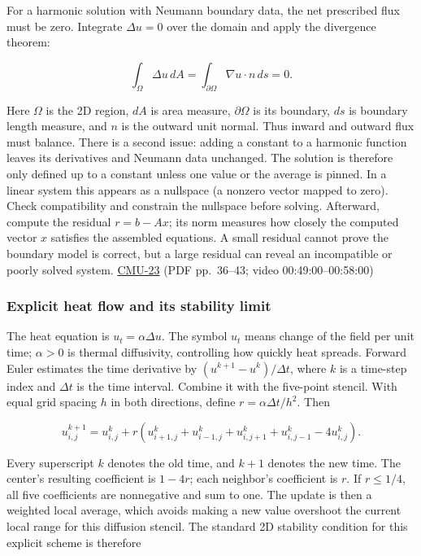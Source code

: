 For a harmonic solution with Neumann boundary data, the net prescribed flux must be zero. Integrate \(\Delta u=0\) over the domain and apply the divergence theorem:

\[
\int_\Omega \Delta u\,dA
=\int_{\partial\Omega}\nabla u\cdot n\,ds
=0.
\]

Here \(\Omega\) is the 2D region, \(dA\) is area measure, \(\partial\Omega\) is its boundary, \(ds\) is boundary length measure, and \(n\) is the outward unit normal. Thus inward and outward flux must balance. There is a second issue: adding a constant to a harmonic function leaves its derivatives and Neumann data unchanged. The solution is therefore only defined up to a constant unless one value or the average is pinned. In a linear system this appears as a nullspace (a nonzero vector mapped to zero). Check compatibility and constrain the nullspace before solving. Afterward, compute the residual \(r=b-Ax\); its norm measures how closely the computed vector \(x\) satisfies the assembled equations. A small residual cannot prove the boundary model is correct, but a large residual can reveal an incompatible or poorly solved system. \hyperref[04-visual-computing-ii-ch036-cmu-23---physically-based-animation-and-pdes]{CMU-23} (PDF pp.~36--43; video 00:49:00--00:58:00)

\subsubsection{Explicit heat flow and its stability limit}\label{04-visual-computing-ii-ch030-explicit-heat-flow-and-its-stability-limit}

The heat equation is \(u_t=\alpha\Delta u\). The symbol \(u_t\) means change of the field per unit time; \(\alpha>0\) is thermal diffusivity, controlling how quickly heat spreads. Forward Euler estimates the time derivative by \((u^{k+1}-u^k)/\Delta t\), where \(k\) is a time-step index and \(\Delta t\) is the time interval. Combine it with the five-point stencil. With equal grid spacing \(h\) in both directions, define \(r=\alpha\Delta t/h^2\). Then

\[
u_{i,j}^{k+1}=u_{i,j}^{k}+r\left(u_{i+1,j}^{k}+u_{i-1,j}^{k}+u_{i,j+1}^{k}+u_{i,j-1}^{k}-4u_{i,j}^{k}\right).
\]

Every superscript \(k\) denotes the old time, and \(k+1\) denotes the new time. The center's resulting coefficient is \(1-4r\); each neighbor's coefficient is \(r\). If \(r\le1/4\), all five coefficients are nonnegative and sum to one. The update is then a weighted local average, which avoids making a new value overshoot the current local range for this diffusion stencil. The standard 2D stability condition for this explicit scheme is therefore

